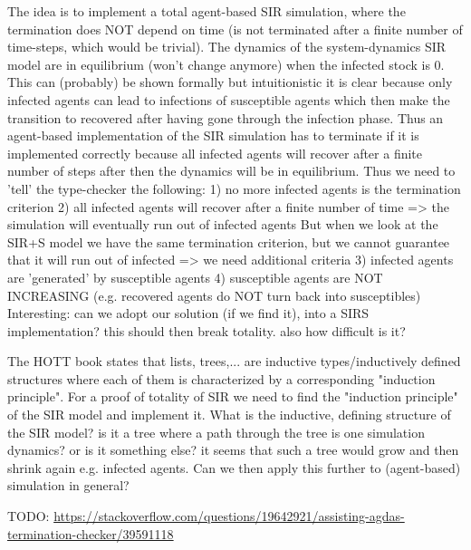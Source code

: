 The idea is to implement a total agent-based SIR simulation, where the termination does NOT depend on time (is not terminated after a finite number of time-steps, which would be trivial). The dynamics of the system-dynamics SIR model are in equilibrium (won't change anymore) when the infected stock is 0. This can (probably) be shown formally but intuitionistic it is clear because only infected agents can lead to infections of susceptible agents which then make the transition to recovered after having gone through the infection phase. Thus an agent-based implementation of the SIR simulation has to terminate if it is implemented correctly because all infected agents will recover after a finite number of steps after then the dynamics will be in equilibrium.
Thus we need to 'tell' the type-checker the following:
1) no more infected agents is the termination criterion
2) all infected agents will recover after a finite number of time => the simulation will eventually run out of infected agents But when we look at the SIR+S model we have the same termination criterion, but we cannot guarantee that it will run out of infected => we need additional criteria
3) infected agents are 'generated' by susceptible agents
4) susceptible agents are NOT INCREASING (e.g. recovered agents do NOT turn back into susceptibles)
Interesting: can we adopt our solution (if we find it), into a SIRS	implementation? this should then break totality. also how difficult is it?

The HOTT book states that lists, trees,... are inductive types/inductively defined structures where each of them is characterized by a corresponding "induction principle". For a proof of totality of SIR we need to find the "induction principle" of the SIR model and implement it. What is the inductive, defining structure of the SIR model? is it a tree where a path through the tree is one simulation dynamics? or is it something else? it seems that such a tree would grow and then shrink again e.g. infected agents. Can we then apply this further to (agent-based) simulation in general?

TODO: \url{https://stackoverflow.com/questions/19642921/assisting-agdas-termination-checker/39591118}